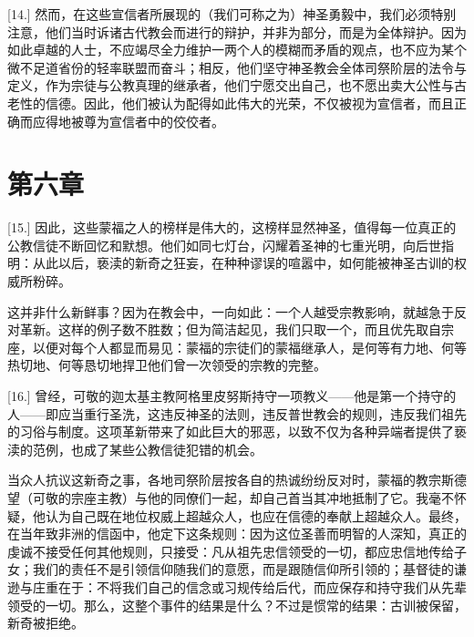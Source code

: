 [14.] 然而，在这些宣信者所展现的（我们可称之为）神圣勇毅中，我们必须特别注意，他们当时诉诸古代教会而进行的辩护，并非为部分，而是为全体辩护。因为如此卓越的人士，不应竭尽全力维护一两个人的模糊而矛盾的观点，也不应为某个微不足道省份的轻率联盟而奋斗；相反，他们坚守神圣教会全体司祭阶层的法令与定义，作为宗徒与公教真理的继承者，他们宁愿交出自己，也不愿出卖大公性与古老性的信德。因此，他们被认为配得如此伟大的光荣，不仅被视为宣信者，而且正确而应得地被尊为宣信者中的佼佼者。\par


\section{第六章}

\par

[15.] 因此，这些蒙福之人的榜样是伟大的，这榜样显然神圣，值得每一位真正的公教信徒不断回忆和默想。他们如同七灯台，闪耀着圣神的七重光明，向后世指明：从此以后，亵渎的新奇之狂妄，在种种谬误的喧嚣中，如何能被神圣古训的权威所粉碎。\par

这并非什么新鲜事？因为在教会中，一向如此：一个人越受宗教影响，就越急于反对革新。这样的例子数不胜数；但为简洁起见，我们只取一个，而且优先取自宗座，以便对每个人都显而易见：蒙福的宗徒们的蒙福继承人，是何等有力地、何等热切地、何等恳切地捍卫他们曾一次领受的宗教的完整。\par

[16.] 曾经，可敬的迦太基主教阿格里皮努斯持守一项教义——他是第一个持守的人——即应当重行圣洗，这违反神圣的法则，违反普世教会的规则，违反我们祖先的习俗与制度。这项革新带来了如此巨大的邪恶，以致不仅为各种异端者提供了亵渎的范例，也成了某些公教信徒犯错的机会。\par

当众人抗议这新奇之事，各地司祭阶层按各自的热诚纷纷反对时，蒙福的教宗斯德望（可敬的宗座主教）与他的同僚们一起，却自己首当其冲地抵制了它。我毫不怀疑，他认为自己既在地位权威上超越众人，也应在信德的奉献上超越众人。最终，在当年致非洲的信函中，他定下这条规则：因为这位圣善而明智的人深知，真正的虔诚不接受任何其他规则，只接受：凡从祖先忠信领受的一切，都应忠信地传给子女；我们的责任不是引领信仰随我们的意愿，而是跟随信仰所引领的；基督徒的谦逊与庄重在于：不将我们自己的信念或习规传给后代，而应保存和持守我们从先辈领受的一切。那么，这整个事件的结果是什么？不过是惯常的结果：古训被保留，新奇被拒绝。\par

